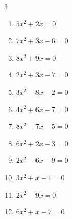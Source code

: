 \begin{multicols}{3}
\begin{enumerate}

  \item $5x^{2}+2x=0$


  \item $7x^{2}+3x-6=0$


  \item $8x^{2}+9x=0$


\columnbreak %

  \item $2x^{2}+3x-7=0$


  \item $3x^{2}-8x-2=0$


  \item $4x^{2}+6x-7=0$


  \item $8x^{2}-7x-5=0$


  \item $6x^{2}+2x-3=0$


  \item $2x^{2}-6x-9=0$


  \item $3x^{2}+x-1=0$


\columnbreak %

\resetques

  \item $2x^{2}-9x=0$


  \item $6x^{2}+x-7=0$


\end{enumerate}
\end{multicols}
